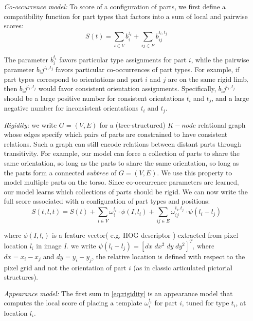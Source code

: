 \textit{Co-occurrence model:} To score of a configuration of parts, we first 
define a compatibility function for part types that factors into a sum of local and pairwise scores:
\begin{equation}
S(t)=\sum_{i\in V} b_i^{t_i} + \sum_{ij\in E} b_{ij}^{t_i,t_j}
\end{equation}

The parameter $b_i^{t_i}$ favors particular type assignments for part $i$, while
the pairwise parameter $b_ij^{t_i,t_j}$ favors particular co-occurrences of part types.
For example, if part types correspond to orientations and part $i$ and $j$ are on the
same rigid limb, then  $b_ij^{t_i,t_j}$ would favor consistent orientation assignments.
Specifically,  $b_ij^{t_i,t_j}$ should be a large positive number for consistent
orientations $t_i$ and $t_j$, and a large negative number for inconsistent orientations
$t_i$ and $t_j$.

\textit{Rigidity:} we write $G = (V,E)$ for a (tree-structured) $K-node$ relational
graph whose edges specify which pairs of parts are constrained to have consistent
relations. Such a graph can still encode relations between distant parts through transitivity.
For example, our model can force a collection of parts to share the same orientation,
so long as the parts to share the same orientation, so long as the parts form a connected
$subtree$ of $G = (V,E)$. We use this property to model multiple parts on the torso.
Since co-occurrence parameters are learned, our model learns which collections of parts should be rigid.
We can now write the full score associated with a configuration of part types and positions:
\begin{equation}
\label{eq:rigidity}
S(t,l,t)=S(t) + \sum_{i\in V} \omega_i^{t_i} \cdot \phi(I,l_i) + \sum_{ij\in E} \omega_{ij}^{t_i,t_j} \cdot \psi(l_i - l_j)
\end{equation}

where $\phi(I,l_i)$ is a feature vector( e.g, HOG descriptor \citet{Dalal2005})
extracted from pixel location $l_i$ in image $I$. we write $\psi(l_i - l_j)=[dx\; dx^2\; dy\; dy^2]^T$, 
where $dx=x_i - x_j$ and $dy=y_i - y_j$, the relative location is defined
with respect to the pixel grid and not the orientation of part $i$ (as in classic 
articulated pictorial structures).

\textit{Appearance model:} The first sum in \ref{eq:rigidity} is an appearance model 
that computes the local score of placing a template $\omega_i^{t_i}$ for part $i$,
tuned for type $t_i$, at location $l_i$.

